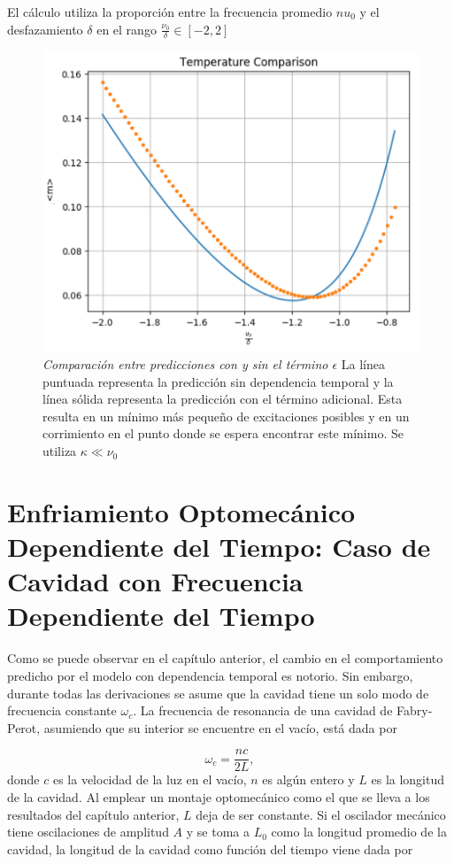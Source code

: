 \documentclass[10pt,a4paper]{report}
\begin{document}
El cálculo utiliza la proporción entre la frecuencia promedio $nu_0$ y el desfazamiento $\delta$ en el rango $\frac{\nu_0}{\delta} \in [-2,2]$

\begin{figure}
\includegraphics[scale=.55]{GraficaTemp.pdf} 
\caption{\textit{Comparación entre predicciones con y sin el término $\epsilon$} La línea puntuada representa la predicción sin dependencia temporal y la línea sólida representa la predicción con el término adicional. Esta resulta en un mínimo más pequeño de excitaciones posibles y en un corrimiento en el punto donde se espera encontrar este mínimo. Se utiliza $\kappa \ll \nu_0$}
\end{figure}

\chapter{Enfriamiento Optomecánico Dependiente del Tiempo: Caso de Cavidad con Frecuencia Dependiente del Tiempo}

Como se puede observar en el capítulo anterior, el cambio en el comportamiento predicho por el modelo con dependencia temporal es notorio. Sin embargo, durante todas las derivaciones se asume que la cavidad tiene un solo modo de frecuencia constante $\omega_c$. La frecuencia de resonancia de una cavidad de Fabry-Perot, asumiendo que su interior se encuentre en el vacío, está dada por

\begin{equation}
\omega_c = \frac{nc}{2L},
\end{equation} donde $c$ es la velocidad de la luz en el vacío, $n$ es algún entero y $L$ es la longitud de la cavidad. Al emplear un montaje optomecánico como el que se lleva a los resultados del capítulo anterior, $L$ deja de ser constante. Si el oscilador mecánico tiene oscilaciones de amplitud $A$ y se toma a $L_0$ como la longitud promedio de la cavidad, la longitud de la cavidad como función del tiempo viene dada por
\end{document}
